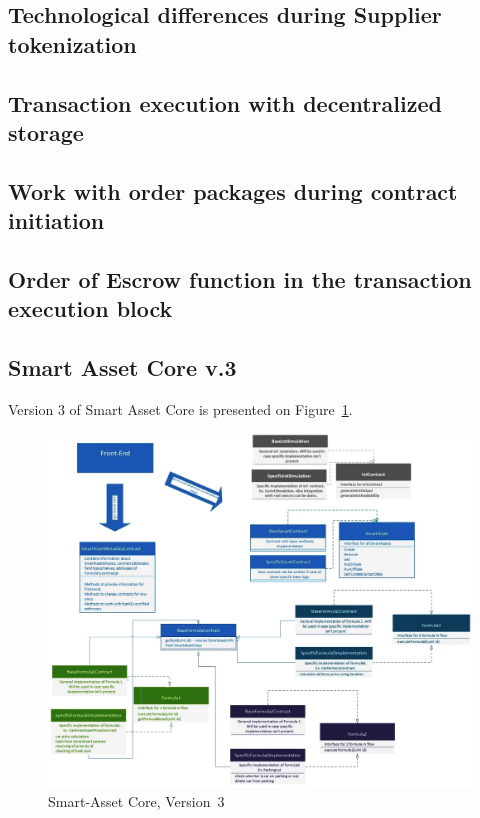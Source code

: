 \documentclass{article}
\begin{document}
\begin{multicols}{2}
\text{ }

\subsection{Technological differences during Supplier tokenization}

\text{ }

\subsection{Transaction execution with decentralized storage}

\text{ }

\subsection{Work with order packages during contract initiation}

\text{ }

\subsection{Order of Escrow function in the transaction execution block}


\text{ }

\subsection{Smart Asset Core v.3}

Version 3 of Smart Asset Core is presented on Figure~\ref{fig:sa-core-v3}.

\begin{figure}
  \centering
  \includegraphics[width=\textwidth]{sa-core-v3.png}
  \caption{Smart-Asset Core, Version~3}
  \label{fig:sa-core-v3}
\end{figure}


\end{multicols}
\end{document}
